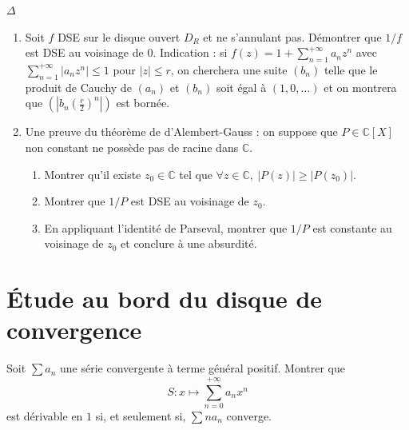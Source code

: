 \documentclass[french,a4paper]{article}
\newcommand{\C}{\mathbb{C}}
\theoremstyle{plain}
\theoremstyle{definition}
\theoremstyle{remark}
\begin{document}
\begin{ex}[Châteaux]{$\Delta$}
	\begin{enumerate}
		\item Soit $f$ DSE sur le disque ouvert $D_R$ et ne s'annulant pas.
		Démontrer que $1/f$ est DSE au voisinage de $0$. Indication : si $f(z)=1+\displaystyle\sum_{n=1}^{+\infty}a_nz^n$ avec $\displaystyle\sum_{n=1}^{+\infty}\lvert a_nz^n\rvert \leqslant 1$ pour $\lvert z\rvert\leqslant r$, on cherchera une suite $(b_n)$ telle que le produit de Cauchy de $(a_n)$ et $(b_n)$ soit égal à $(1,0,\ldots)$ et on montrera que $\displaystyle\left(\left\lvert b_n\left(\frac{r}{2}\right)^n\right\rvert\right)$ est bornée.
		\item  Une preuve du théorème de d'Alembert-Gauss : on suppose que $P\in\C[X]$ non constant ne possède pas de racine dans $\C$.
		\begin{enumerate}[label=\alph*.]
			\item Montrer qu'il existe $z_0\in\C$ tel que $\forall z\in\C,\ \lvert P(z)\rvert\geqslant\lvert P(z_0)\rvert$.
			\item Montrer que $1/P$ est DSE au voisinage de $z_0$.
			\item En appliquant l'identité de Parseval, montrer que $1/P$ est constante au voisinage de $z_0$ et conclure à une absurdité.
		\end{enumerate}
	\end{enumerate}
\end{ex}

\section{Étude au bord du disque de convergence}

\begin{ex}[Moulin.SE.51]{}
	Soit $\displaystyle\sum a_n$ une série convergente à terme général positif. Montrer que $$S:x\mapsto\sum_{n=0}^{+\infty}a_nx^n$$ est dérivable en $1$ si, et seulement si, $\displaystyle\sum na_n$ converge.
\end{ex}
\end{document}
